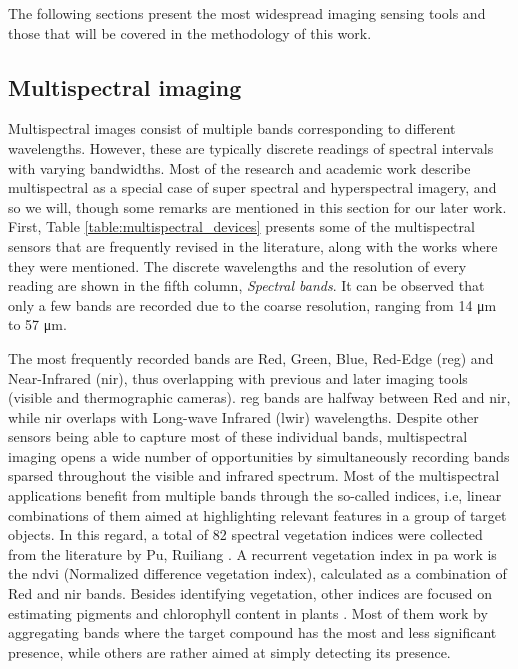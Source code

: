 The following sections present the most widespread imaging sensing tools and those that will be covered in the methodology of this work.

\subsection{Multispectral imaging}
\label{sec:multispectral_imaging}

Multispectral images consist of multiple bands corresponding to different wavelengths. However, these are typically discrete readings of spectral intervals with varying bandwidths. Most of the research and academic work describe multispectral as a special case of super spectral and hyperspectral imagery, and so we will, though some remarks are mentioned in this section for our later work. First, Table \ref{table:multispectral_devices} presents some of the multispectral sensors that are frequently revised in the literature, along with the works where they were mentioned. The discrete wavelengths and the resolution of every reading are shown in the fifth column, \textit{Spectral bands}. It can be observed that only a few bands are recorded due to the coarse resolution, ranging from 14 \si{\micro\meter} to 57 \si{\micro\meter}.

The most frequently recorded bands are Red, Green, Blue, Red-Edge (\acrshort{reg}) and Near-Infrared (\acrshort{nir}), thus overlapping with previous and later imaging tools (visible and thermographic cameras). \acrshort{reg} bands are halfway between Red and \acrshort{nir}, while \acrshort{nir} overlaps with Long-wave Infrared (\acrshort{lwir}) wavelengths. Despite other sensors being able to capture most of these individual bands, multispectral imaging opens a wide number of opportunities by simultaneously recording bands sparsed throughout the visible and infrared spectrum. Most of the multispectral applications benefit from multiple bands through the so-called indices, i.e, linear combinations of them aimed at highlighting relevant features in a group of target objects. In this regard, a total of 82 spectral vegetation indices were collected from the literature by Pu, Ruiliang \cite{pu_hyperspectral_2017}. A recurrent vegetation index in \acrshort{pa} work is the \acrshort{ndvi} (Normalized difference vegetation index), calculated as a combination of Red and \acrshort{nir} bands. Besides identifying vegetation, other indices are focused on estimating pigments and chlorophyll content in plants \cite{pu_hyperspectral_2017}. Most of them work by aggregating bands where the target compound has the most and less significant presence, while others are rather aimed at simply detecting its presence.

